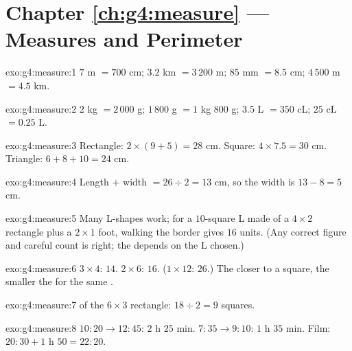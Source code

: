 \section*{Chapter \ref{ch:g4:measure} --- Measures and Perimeter}

\begin{solution}{exo:g4:measure:1}
$7$ m $= 700$ cm; \quad $3.2$ km $= 3\,200$ m; \quad
$85$ mm $= 8.5$ cm; \quad $4\,500$ m $= 4.5$ km.
\end{solution}

\begin{solution}{exo:g4:measure:2}
$2$ kg $= 2\,000$ g; \quad $1\,800$ g $= 1$ kg $800$ g; \quad
$3.5$ L $= 350$ cL; \quad $25$ cL $= 0.25$ L.
\end{solution}

\begin{solution}{exo:g4:measure:3}
Rectangle: $2 \times (9 + 5) = 28$ cm. Square:
$4 \times 7.5 = 30$ cm. Triangle: $6 + 8 + 10 = 24$ cm.
\end{solution}

\begin{solution}{exo:g4:measure:4}
Length $+$ width $= 26 \div 2 = 13$ cm, so the width is
$13 - 8 = 5$ cm.
\end{solution}

\begin{solution}{exo:g4:measure:5}
Many L-shapes work; for a $10$-square L made of a $4 \times 2$
rectangle plus a $2 \times 1$ foot, walking the border gives $16$
units. (Any correct figure and careful count is right; the
 depends on the L chosen.)
\end{solution}

\begin{solution}{exo:g4:measure:6}
$3 \times 4$:  $14$. $2 \times 6$:  $16$.
($1 \times 12$:  $26$.) The closer to a square, the
smaller the  for the same .
\end{solution}

\begin{solution}{exo:g4:measure:7}
 of the $6 \times 3$ rectangle: $18 \div 2 = 9$ squares.
\end{solution}

\begin{solution}{exo:g4:measure:8}
$10{:}20 \to 12{:}45$: $2$ h $25$ min. $7{:}35 \to 9{:}10$:
$1$ h $35$ min. Film: $20{:}30 + 1$ h $50 = 22{:}20$.
\end{solution}

